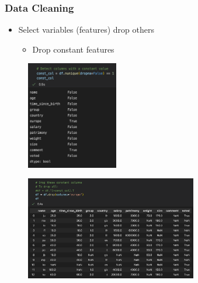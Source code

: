 \begin{frame}\frametitle{Data Cleaning}
   \begin{itemize}
      \item Select variables (features) drop others
      \begin{itemize}
         \item Drop constant features
      \end{itemize}
   \end{itemize}
   \vspace{1cm}
   \begin{minipage}{0.38\linewidth}
      \begin{figure}[H]
         \includegraphics[width=4cm]{../images/illustrations/data_cleaning_detect_constants.png}
      \end{figure}
   \end{minipage}
   \begin{minipage}{0.58\linewidth}
      \begin{figure}[H]
         \includegraphics[width=7.5cm]{../images/illustrations/data_cleaning_remove_constants.png}
      \end{figure}
   \end{minipage}
\end{frame}



